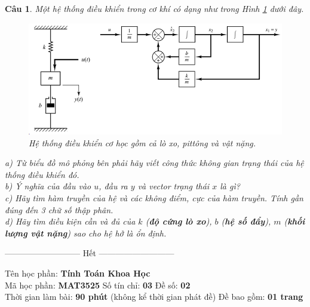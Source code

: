 \documentclass[11pt]{article}
\newtheorem{bt}{Câu}
\begin{document}
\begin{bt}\label{Câu 1}
Một hệ thống điều khiển trong cơ khí có dạng như trong Hình \ref{fig:mechanicalsystem} dưới đây. 

\begin{figure}[!h]
	\centering
	\includegraphics[width=0.7\linewidth]{Mechanical_System}
	\caption[Hệ thống điều khiển cơ học]{Hệ thống điều khiển cơ học gồm cả lò xo, pittông và vật nặng.}
	\label{fig:mechanicalsystem}
\end{figure}

a) Từ biểu đồ mô phỏng bên phải hãy viết công thức không gian trạng thái của hệ thống điều khiển đó. \\
b) Ý nghĩa của đầu vào $u$, đầu ra $y$ và vector trạng thái $x$ là gì? \\
c) Hãy tìm hàm truyền của hệ và các không điểm, cực của hàm truyền. Tính gần đúng đến 3 chữ số thập phân. \\
d) Hãy tìm điều kiện cần và đủ của $k$ (\textbf{độ cứng lò xo}), $b$ (\textbf{hệ số đẩy}), $m$ (\textbf{khối lượng vật nặng}) sao cho hệ hở là ổn định.
\end{bt}


\begin{center}
	--------------------------- Hết ---------------------------
\end{center}

\pagebreak 




\begin{center}
	Tên học phần: {\bf Tính Toán Khoa Học} \\ 
	Mã học phần: \textbf{MAT3525}	\quad Số tín chỉ: \textbf{03} \quad	Đề số: \textbf{02} \\ 
	Thời gian làm bài: \textbf{90 phút} (không kể thời gian phát đề) \quad Đề bao gồm: \textbf{01 trang}
\end{center}
\end{document}
